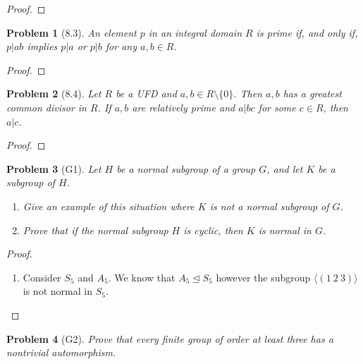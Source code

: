\documentclass[10pt]{article}
\newcommand{\sk}{\vskip 10mm}
\theoremstyle{plain}
\newtheorem{problem}{Problem}
\theoremstyle{remark}
\begin{document}
\begin{proof}
  
\end{proof}

\sk

\begin{problem}[8.3]
  An element $p$ in an integral domain $R$ is prime if, and only if,
  $p|ab$ implies $p|a$ or $p|b$ for any $a,b\in R$.
\end{problem}

\begin{proof}
  
\end{proof}

\sk

\begin{problem}[8.4]
  Let $R$ be a UFD and $a,b\in R\setminus\{0\}$. Then $a,b$ has a greatest
  common divisor in $R$. If $a,b$ are relatively prime and $a|bc$ for some
  $c\in R$, then $a|c$.
\end{problem}

\begin{proof}
  
\end{proof}

\sk

\begin{problem}[G1]
  Let $H$ be a normal subgroup of a group $G$, and let $K$ be a subgroup of $H$.
  \begin{enumerate}
  \item Give an example of this situation where $K$ is not a normal
    subgroup of $G$.
  \item Prove that if the normal subgroup $H$ is cyclic, then $K$ is normal
    in $G$.
  \end{enumerate}
\end{problem}

\begin{proof}
  \begin{enumerate}
  \item Consider $S_5$ and $A_5$. We know that $A_5\trianglelefteq S_5$ however
    the subgroup $\langle(1\ 2\ 3)\rangle$ is not normal in $S_5$.
  \end{enumerate}
\end{proof}

\sk

\begin{problem}[G2]
  Prove that every finite group of order at least three has a nontrivial
  automorphism.
\end{problem}
\end{document}
